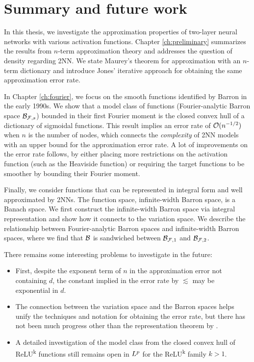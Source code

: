 \chapter{Summary and future work}

In this thesis, we investigate the approximation properties of two-layer neural
networks with various activation functions. Chapter \ref{ch:preliminary}
summarizes the results from $n$-term approximation theory and addresses the
question of density regarding 2NN. We state Maurey's theorem for approximation
with an $n$-term dictionary and introduce Jones' iterative approach for
obtaining the same approximation error rate.

In Chapter \ref{ch:fourier}, we focus on the smooth functions identified by
Barron in the early 1990s. We show that a model class of functions
(Fourier-analytic Barron space $\mathcal{B}_{\mathcal{F},s}$) bounded in their first
Fourier moment is the closed convex hull of a dictionary of sigmoidal functions.
This result implies an error rate of $\mathcal{O}(n^{-1/2})$ when $n$ is the number of
nodes, which connects the \textit{complexity} of 2NN models with an upper bound
for the approximation error rate. A lot of improvements on the error rate
follows, by either placing more restrictions on the activation function (such as
the Heaviside function) or requiring the target functions to be smoother by
bounding their Fourier moment.

Finally, we consider functions that can be represented in integral form and well
approximated by 2NNs. The function space, infinite-width Barron space, is a
Banach space. We first construct the infinite-width Barron space via integral
representation and show how it connects to the variation space. We describe the
relationship between Fourier-analytic Barron spaces and infinite-width Barron
spaces, where we find that $\mathcal{B}$ is sandwiched between
$\mathcal{B}_{\mathcal{F},1}$ and $\mathcal{B}_{\mathcal{F},2}$.

There remains some interesting problems to investigate in the future:

\begin{itemize}
    \item First, despite the exponent term of $n$ in the approximation error not
    containing $d$, the constant implied in the error rate by $\lesssim$ may be
    exponential in $d$. 
    \item The connection between the variation space and the Barron spaces helps
    unify the techniques and notation for obtaining the error rate, but there
    has not been much progress other than the representation theorem by
    \cite{parhiBanachSpaceRepresenter2021}.
    \item A detailed investigation of the model class from the closed convex
    hull of ReLU\textsuperscript{k} functions still remains open in $L^{p}$ for
    the ReLU\textsuperscript{k} family $k > 1$.
\end{itemize}


